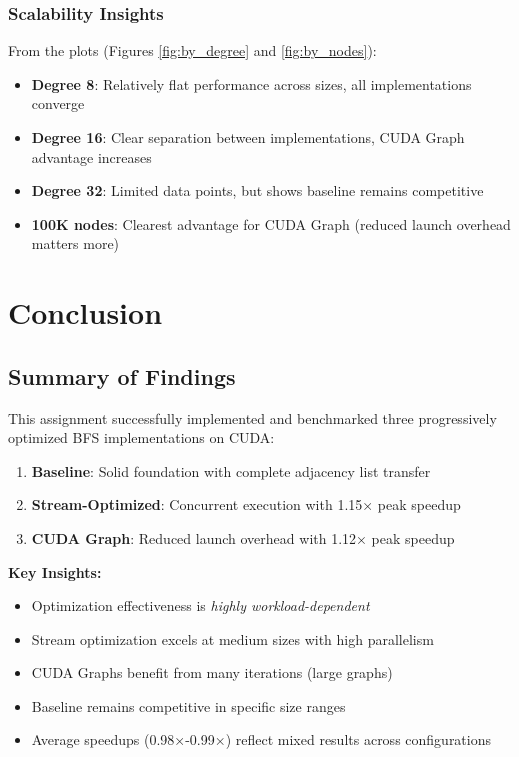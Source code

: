 \documentclass[11pt,a4paper]{article}
\begin{document}
\subsubsection{Scalability Insights}

From the plots (Figures \ref{fig:by_degree} and \ref{fig:by_nodes}):

\begin{itemize}
    \item \textbf{Degree 8}: Relatively flat performance across sizes, all implementations converge
    \item \textbf{Degree 16}: Clear separation between implementations, CUDA Graph advantage increases
    \item \textbf{Degree 32}: Limited data points, but shows baseline remains competitive
    \item \textbf{100K nodes}: Clearest advantage for CUDA Graph (reduced launch overhead matters more)
\end{itemize}

\section{Conclusion}

\subsection{Summary of Findings}

This assignment successfully implemented and benchmarked three progressively optimized BFS implementations on CUDA:

\begin{enumerate}
    \item \textbf{Baseline}: Solid foundation with complete adjacency list transfer
    \item \textbf{Stream-Optimized}: Concurrent execution with 1.15× peak speedup
    \item \textbf{CUDA Graph}: Reduced launch overhead with 1.12× peak speedup
\end{enumerate}

\textbf{Key Insights:}
\begin{itemize}
    \item Optimization effectiveness is \textit{highly workload-dependent}
    \item Stream optimization excels at medium sizes with high parallelism
    \item CUDA Graphs benefit from many iterations (large graphs)
    \item Baseline remains competitive in specific size ranges
    \item Average speedups (0.98×-0.99×) reflect mixed results across configurations
\end{itemize}
\end{document}
